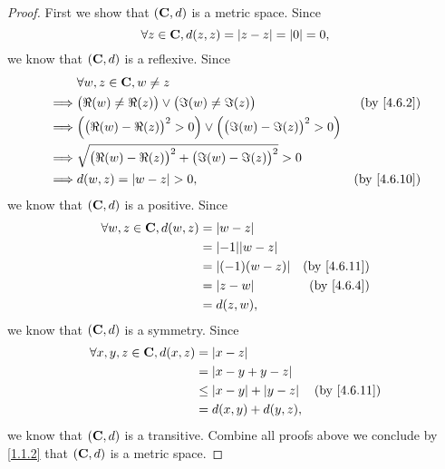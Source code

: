 \begin{proof}
  First we show that \((\mathbf{C}, d)\) is a metric space.
  Since
  \[
    \forall z \in \mathbf{C}, d(z, z) = \left\lvert z - z\right\rvert = \left\lvert0\right\rvert = 0,
  \]
  we know that \((\mathbf{C}, d)\) is a reflexive.
  Since
  \begin{align*}
             & \forall w, z \in \C, w \neq z                                                                                        \\
    \implies & \big(\Re(w) \neq \Re(z)\big) \lor \big(\Im(w) \neq \Im(z)\big)                           & \text{(by \cref{4.6.2})}  \\
    \implies & \Big(\big(\Re(w) - \Re(z)\big)^2 > 0\Big) \lor \Big(\big(\Im(w) - \Im(z)\big)^2 > 0\Big)                             \\
    \implies & \sqrt{\big(\Re(w) - \Re(z)\big)^2 + \big(\Im(w) - \Im(z)\big)^2} > 0                                                 \\
    \implies & d(w, z) = \abs{w - z} > 0,                                                               & \text{(by \cref{4.6.10})}
  \end{align*}
  we know that \((\mathbf{C}, d)\) is a positive.
  Since
  \begin{align*}
    \forall w, z \in \C, d(w, z) & = \abs{w - z}                                      \\
                                 & = \abs{-1} \abs{w - z}                             \\
                                 & = \abs{(-1) (w - z)}   & \text{(by \cref{4.6.11})} \\
                                 & = \abs{z - w}          & \text{(by \cref{4.6.4})}  \\
                                 & = d(z, w),
  \end{align*}
  we know that \((\mathbf{C}, d)\) is a symmetry.
  Since
  \begin{align*}
    \forall x, y, z \in \C, d(x, z) & = \abs{x - z}                                              \\
                                    & = \abs{x - y + y - z}                                      \\
                                    & \leq \abs{x - y} + \abs{y - z} & \text{(by \cref{4.6.11})} \\
                                    & = d(x, y) + d(y, z),
  \end{align*}
  we know that \((\mathbf{C}, d)\) is a transitive.
  Combine all proofs above we conclude by \cref{1.1.2} that \((\mathbf{C}, d)\) is a metric space.


\end{proof}
